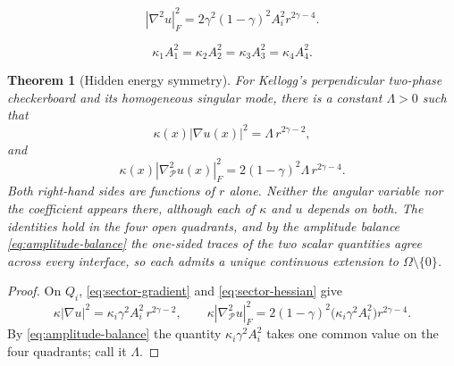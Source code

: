 \documentclass[10pt,a4paper]{amsart}
\newtheorem{thm}{Theorem}
\newcommand{\Pcal}{\mathcal{P}}
\newcommand{\gradb}{\nabla_{\Pcal}}
\begin{document}
\begin{equation}\label{eq:sector-hessian}
 |\nabla^2u|_F^2
 =2\gamma^2(1-\gamma)^2A_i^2r^{2\gamma-4}.
\end{equation}

\begin{equation}\label{eq:amplitude-balance}
 \boxed{
 \kappa_1A_1^2=\kappa_2A_2^2=\kappa_3A_3^2=\kappa_4A_4^2.}
\end{equation}

\begin{thm}[Hidden energy symmetry]\label{thm:main}
For Kellogg's perpendicular two-phase checkerboard and its homogeneous singular mode, there is a constant $\Lambda>0$ such that
\begin{equation}\label{eq:main-gradient}
  \boxed{\kappa(x)|\nabla u(x)|^2=\Lambda\, r^{2\gamma-2},}
\end{equation}
and
\begin{equation}\label{eq:main-hessian}
  \boxed{\kappa(x)|\gradb^2u(x)|_F^2
  =2(1-\gamma)^2\Lambda\, r^{2\gamma-4}.}
\end{equation}
Both right-hand sides are functions of $r$ alone.  Neither the angular variable nor the coefficient appears there, although each of $\kappa$ and $u$ depends on both.  The identities hold in the four open quadrants, and by the amplitude balance \eqref{eq:amplitude-balance} the one-sided traces of the two scalar quantities agree across every interface, so each admits a unique continuous extension to $\Omega\setminus\{0\}$.
\end{thm}

\begin{proof}
On $Q_i$, \eqref{eq:sector-gradient} and \eqref{eq:sector-hessian} give
\[
\kappa|\nabla u|^2=\kappa_i\gamma^2A_i^2\,r^{2\gamma-2}, \qquad \kappa|\gradb^2u|_F^2=2(1-\gamma)^2\bigl(\kappa_i\gamma^2A_i^2\bigr)r^{2\gamma-4}.
\]
By \eqref{eq:amplitude-balance} the quantity $\kappa_i\gamma^2A_i^2$ takes one common value on the four quadrants; call it $\Lambda$.
\end{proof}
\end{document}
